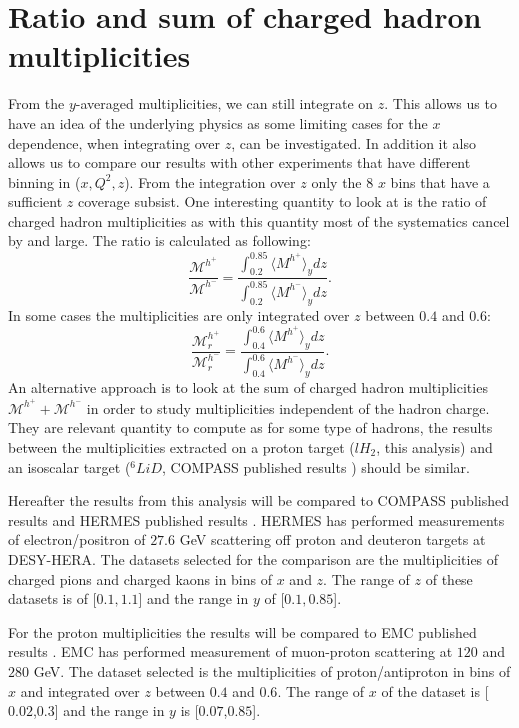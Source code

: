 \section{Ratio and sum of charged hadron multiplicities}

From the $y$-averaged multiplicities, we can still integrate on $z$. This allows us to have an idea of the underlying physics as some limiting cases for the $x$ dependence, when integrating over $z$, can be investigated. In addition it also allows us to compare our results with other experiments that have different binning in ($x,Q^2,z$). From the integration over $z$ only the 8 $x$ bins that have a sufficient $z$ coverage subsist. One interesting quantity to look at is the ratio of charged hadron multiplicities as with this quantity most of the systematics cancel by and large. The ratio is calculated as following:
%
\begin{equation}
  \frac{\mathscr{M}^{h^+}}{\mathscr{M}^{h^-}} = \frac{\int_{0.2}^{0.85} \langle M^{h^+} \rangle_y dz}{\int_{0.2}^{0.85} \langle M^{h^-} \rangle_y dz}.
\end{equation}
%
In some cases the multiplicities are only integrated over $z$ between $0.4$ and $0.6$:
%
\begin{equation}
  \frac{\mathscr{M}^{h^+}_{r}}{\mathscr{M}^{h^-}_{r}} = \frac{\int_{0.4}^{0.6} \langle M^{h^+} \rangle_y dz}{\int_{0.4}^{0.6} \langle M^{h^-} \rangle_y dz}.
\end{equation}
%
An alternative approach is to look at the sum of charged hadron multiplicities $\mathscr{M}^{h^+}+\mathscr{M}^{h^-}$ in order to study multiplicities independent of the hadron charge. They are relevant quantity to compute as for some type of hadrons, the results between the multiplicities extracted on a proton target ($lH_2$, this analysis) and an isoscalar target ($^6LiD$, COMPASS published results \cite{COMPASS2006Pi,COMPASS2006K}) should be similar.

Hereafter the results from this analysis will be compared to COMPASS published results and HERMES published results \cite{HERMESMult}. HERMES has performed measurements of electron/positron of $27.6$ GeV scattering off proton and deuteron targets at DESY-HERA. The datasets selected for the comparison are the multiplicities of charged pions and charged kaons in bins of $x$ and $z$. The range of $z$ of these datasets is of [$0.1,1.1$] and the range in $y$ of [$0.1,0.85$].

For the proton multiplicities the results will be compared to EMC published results \cite{EMCMult}. EMC has performed measurement of muon-proton scattering at $120$ and $280$ GeV. The dataset selected is the multiplicities of proton/antiproton in bins of $x$ and integrated over $z$ between $0.4$ and $0.6$. The range of $x$ of the dataset is [$0.02$,$0.3$] and the range in $y$ is [$0.07$,$0.85$].

